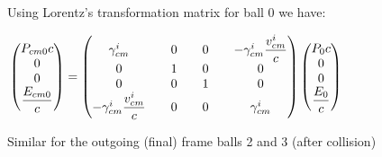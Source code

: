 \documentclass[fleqn]{article}
\begin{document}
Using Lorentz's transformation matrix for ball 0 we have:

$
  \\
  \\
  \begin{pmatrix}
    P_{cm0} c
    \\
    0
    \\
    0
    \\
    \dfrac{E_{cm0}}{c}
  \end{pmatrix}=
  \begin{pmatrix}
    \gamma^i_{cm} && 0 && 0 && -\gamma^i_{cm} \dfrac{v^i_{cm}}{c}
    \\
    0 && 1 && 0 && 0
    \\
    0 && 0 && 1 && 0
    \\
    -\gamma^i_{cm} \dfrac{v^i_{cm}}{c} && 0 && 0 && \gamma^i_{cm}
  \end{pmatrix}
  \begin{pmatrix}
    P_0 c
    \\
    0
    \\
    0
    \\
    \dfrac{E_0}{c}
  \end{pmatrix}
  \\
  \\
$

Similar for the outgoing (final) frame balls 2 and 3 (after collision)
\end{document}
